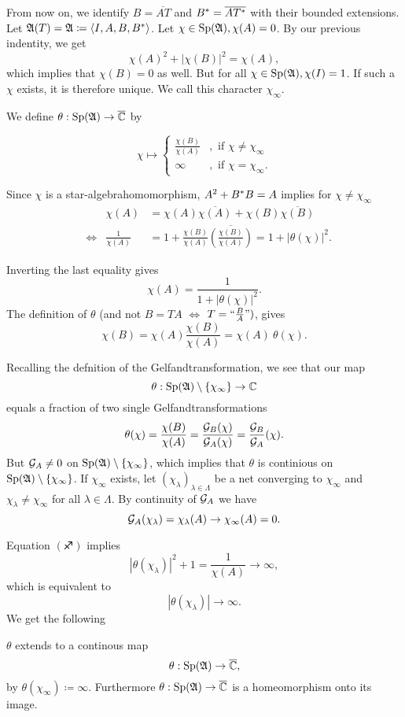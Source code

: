 From now on, we identify $B=\overline{AT}$ and $B^{*} =\overline{AT^{*}}$  with their bounded extensions.
Let $\mathfrak{A} (T) = \mathfrak{A} \coloneqq \left\langle I, A, B , B^{*} \right\rangle$. Let $ \chi \in \operatorname{Sp} (\mathfrak{A}), \chi(A) =0$. By our previous indentity, we get
\[
 \chi(A)^2 + |\chi(B)|^2 = \chi(A),
\]
which implies that $\chi(B) =0$ as well. But for all $\chi \in \operatorname{Sp} (\mathfrak{A}), \chi(I)=1$. If such a $\chi$ exists, it is therefore unique. We call this character $\chi_\infty$.

We define $\theta : \operatorname{Sp} (\mathfrak{A}) \to \overline{\mathbb{C}}$ by

 \[
 \chi \mapsto 
  \begin{cases}
    \frac{\chi(B)}{\chi(A)} &, \text{ if }\chi \neq \chi_\infty\\
    \infty &, \text{ if } \chi = \chi_\infty.
    \end{cases}
 \]
 
 Since $\chi$ is a star-algebrahomomorphism, $A^2 + B^{*} B = A$ implies for $\chi \neq \chi_\infty$
 \begin{align*}
  &  & \chi(A) &= \chi(A) \overline{\chi(A)} + \chi(B) \overline{\chi(B)} \\
  &\Leftrightarrow& \frac{1}{\chi(A)} &= 1 + \frac{\chi(B)}{\chi(A)} \overline{\left( \frac{\chi(B)}{\chi(A)} \right)} = 1 + | \theta(\chi)|^2. 
 \end{align*}

Inverting the last equality gives
\[
 \chi(A) = \frac{1}{1 + |\theta (\chi)|^2} \tag{\blankone}.
\]
The definition of $\theta$ (and not $B= TA$ $\Leftrightarrow$ $T = `` \frac{B}{A} ")$, gives
\[
 \chi(B) = \chi(A) \frac{\chi(B)}{\chi(A)}= \chi(A)~ \theta(\chi) \tag{\blanktwo}.
\]

Recalling the defnition of the Gelfandtransformation, we see that our map
\[
 \theta : \operatorname{Sp}(\mathfrak{A}) \setminus \{\chi_\infty\} \to \mathbb{C}
\]
equals a fraction of two single Gelfandtransformations
\[
 \theta(\chi) = \frac{\chi(B)}{\chi(A)} = \frac{\mathcal{G}_B (\chi)}{\mathcal{G}_A (\chi)}= \frac{\mathcal{G}_B}{\mathcal{G}_A}(\chi).
\]
But $\mathcal{G}_A \neq 0$ on $\operatorname{Sp}(\mathfrak{A}) \setminus \{\chi_\infty\}$, which implies that $\theta$ is continious on $\operatorname{Sp}(\mathfrak{A}) \setminus \{\chi_\infty\}$.
If $\chi_\infty$ exists, let $ \left( \chi_\lambda \right) _{\lambda \in \Lambda}$ be a net converging to $\chi_\infty$ and $\chi_\lambda \neq \chi_\infty$ for all $\lambda \in \Lambda$. By continuity of $\mathcal{G}_A$ we have
\[
 \mathcal{G}_A (\chi_\lambda) = \chi_\lambda (A) \to \chi_\infty (A) = 0.
\]

Equation $(\sagittarius)$ implies
\[
 | \theta( \chi_\lambda ) | ^2  + 1 = \frac{1}{\chi(A)} \to \infty,
\]
which is equivalent to 
\[
 | \theta (\chi_\lambda ) | \to \infty.
\]
We get the following 
\begin{lem}
$\theta$ extends to a continous map
\[
 \theta : \operatorname{Sp}(\mathfrak{A}) \to \overline{\mathbb{C}},
\]
by $\theta (\chi_\infty) \coloneqq \infty$.
Furthermore $\theta : \operatorname{Sp} (\mathfrak{A}) \to \overline{\mathbb{C}}$ is a homeomorphism onto its image.
\end{lem}

